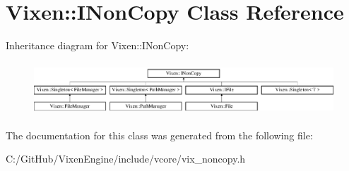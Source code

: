 \hypertarget{class_vixen_1_1_i_non_copy}{}\section{Vixen\+:\+:I\+Non\+Copy Class Reference}
\label{class_vixen_1_1_i_non_copy}
Inheritance diagram for Vixen\+:\+:I\+Non\+Copy\+:\begin{figure}[H]
\begin{center}
\leavevmode
\includegraphics[height=2.000000cm]{class_vixen_1_1_i_non_copy}
\end{center}
\end{figure}


The documentation for this class was generated from the following file\+:\begin{DoxyCompactItemize}
\item 
C\+:/\+Git\+Hub/\+Vixen\+Engine/include/vcore/vix\+\_\+noncopy.\+h\end{DoxyCompactItemize}
